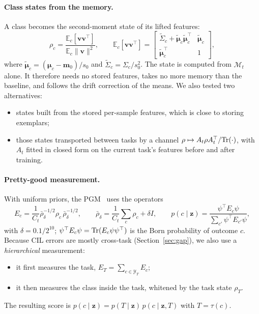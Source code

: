 \paragraph{Class states from the memory.}
A class becomes the second-moment state of its lifted features:
\begin{equation}
  \rho_c=\frac{\mathbb E_c[\mathbf v\mathbf v^{\top}]}{\mathbb E_c\|\mathbf v\|^2},\qquad
  \mathbb E_c[\mathbf v\mathbf v^{\top}]=
  \begin{bmatrix}\tilde\Sigma_c+\tilde{\boldsymbol\mu}_c\tilde{\boldsymbol\mu}_c^{\top} & \tilde{\boldsymbol\mu}_c\\
  \tilde{\boldsymbol\mu}_c^{\top}&1\end{bmatrix},
  \label{eq:state}
\end{equation}
where $\tilde{\boldsymbol\mu}_c=(\boldsymbol\mu_c-\mathbf m_0)/s_0$ and
$\tilde\Sigma_c=\Sigma_c/s_0^2$. The state is computed from $\mathcal M_t$
alone. It therefore needs no stored features, takes no more memory than the
baseline, and follows the drift correction of the means. We also tested two
alternatives:
\begin{itemize}
  \item states built from the stored per-sample features, which is close
    to storing exemplars;
  \item those states transported between tasks by a channel
    $\rho\mapsto A_t\rho A_t^{\top}/\mathrm{Tr}(\cdot)$, with $A_t$ fitted in closed form
    on the current task's features before and after training.
\end{itemize}

\paragraph{Pretty-good measurement.}
With uniform priors, the PGM~\cite{hausladen1994pgm} uses the operators
\begin{equation}
  E_c=\frac1{C_t}\bar\rho_\delta^{-1/2}\rho_c\,\bar\rho_\delta^{-1/2},\qquad
  \bar\rho_\delta=\frac1{C_t}\sum_c\rho_c+\delta I,\qquad
  p(c\mid\mathbf z)=\frac{\psi^{\top}E_c\psi}{\sum_{c'}\psi^{\top}E_{c'}\psi},
  \label{eq:pgm}
\end{equation}
with $\delta=0.1/2^{10}$; $\psi^{\top}E_c\psi=\mathrm{Tr}(E_c\psi\psi^{\top})$ is the Born
probability of outcome $c$. Because CIL errors are mostly cross-task
(Section~\ref{sec:gap}), we also use a \emph{hierarchical} measurement:
\begin{itemize}
  \item it first measures the task, $E_T=\sum_{c\in\mathcal Y_T}E_c$;
  \item it then measures the class inside the task, whitened by the task
    state $\rho_T$.
\end{itemize}
The resulting score is $p(c\mid\mathbf z)=p(T\mid\mathbf z)\,p(c\mid\mathbf z,T)$
with $T=\tau(c)$.

